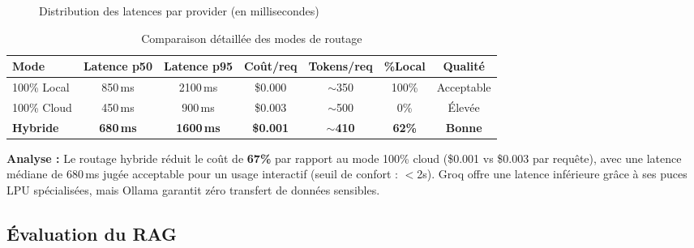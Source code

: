 \documentclass[12pt, a4paper]{article}
\begin{document}
\begin{figure}[H]
\caption{Distribution des latences par provider (en millisecondes)}
\label{fig:latency_dist}
\end{figure}

\begin{table}[H]
\centering
\caption{Comparaison détaillée des modes de routage}
\label{tab:routing_results}
\small
\begin{tabularx}{\textwidth}{l c c c c c c}
\toprule
\textbf{Mode} & \textbf{Latence p50} & \textbf{Latence p95} & \textbf{Coût/req} & \textbf{Tokens/req} & \textbf{\%Local} & \textbf{Qualité} \\
\midrule
100\% Local & 850\,ms & 2100\,ms & \$0.000 & $\sim$350 & 100\% & Acceptable \\
100\% Cloud & 450\,ms & 900\,ms & \$0.003 & $\sim$500 & 0\% & Élevée \\
\rowcolor{ensambg}
\textbf{Hybride} & \textbf{680\,ms} & \textbf{1600\,ms} & \textbf{\$0.001} & $\sim$\textbf{410} & \textbf{62\%} & \textbf{Bonne} \\
\bottomrule
\end{tabularx}
\end{table}

\textbf{Analyse :} Le routage hybride réduit le coût de \textbf{67\%} par rapport au mode 100\% cloud (\$0.001 vs \$0.003 par requête), avec une latence médiane de 680\,ms jugée acceptable pour un usage interactif (seuil de confort : $<$2s). Groq offre une latence inférieure grâce à ses puces LPU spécialisées, mais Ollama garantit zéro transfert de données sensibles.

\subsection{Évaluation du RAG}
\end{document}
